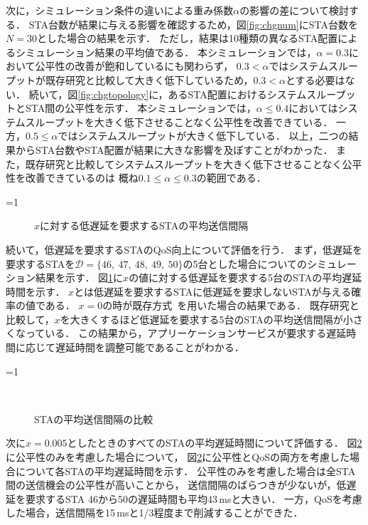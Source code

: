 \documentclass[master]{kuisthesis}		%
\newcounter{flagFig}
\begin{document}
			次に，シミュレーション条件の違いによる重み係数$\alpha$の影響の差について検討する．
			STA台数が結果に与える影響を確認するため，図\ref{fig:chgnum}にSTA台数を$N=30$とした場合の結果を示す．
			ただし，結果は10種類の異なるSTA配置によるシミュレーション結果の平均値である．
			本シミュレーションでは，$\alpha=0.3$において公平性の改善が飽和しているにも関わらず，
			$0.3<\alpha$ではシステムスループットが既存研究と比較して大きく低下しているため，$0.3<\alpha$とする必要はない．
			続いて，図\ref{fig:chgtopology}に，あるSTA配置におけるシステムスループットとSTA間の公平性を示す．
			本シミュレーションでは，$\alpha\leq0.4$においてはシステムスループットを大きく低下させることなく公平性を改善できている．
			一方，$0.5\leq\alpha$ではシステムスループットが大きく低下している．
			以上，二つの結果からSTA台数やSTA配置が結果に大きな影響を及ぼすことがわかった．
			また，既存研究と比較してシステムスループットを大きく低下させることなく公平性を改善できているのは
			概ね$0.1\leq\alpha\leq0.3$の範囲である．

			\par
			\ifnum\value{flagFig}=1 {\begin{figure}[t]
				\centering
				\caption{$x$に対する低遅延を要求するSTAの平均送信間隔}
				\label{fig:chnx}
			\end{figure}}\fi
			続いて，低遅延を要求するSTAのQoS向上について評価を行う．
			まず，低遅延を要求するSTAを${\mathcal D}=\{46,\ 47,\ 48,\ 49,\ 50\}$の5台とした場合についてのシミュレーション結果を示す．
			図\ref{fig:chnx}に$x$の値に対する低遅延を要求する5台のSTAの平均遅延時間を示す．
			$x$とは低遅延を要求するSTAに低遅延を要求しないSTAが与える確率の値である．
			$x=0$の時が既存方式~\cite{promac}を用いた場合の結果である．
			既存研究と比較して，$x$を大きくするほど低遅延を要求する5台のSTAの平均送信間隔が小さくなっている．
			この結果から，アプリーケーションサービスが要求する遅延時間に応じて遅延時間を調整可能であることがわかる．
			\par
			\ifnum\value{flagFig}=1 {\begin{figure}[t]
				\centering
				\\
				\caption{STAの平均送信間隔の比較}
				\label{fig:inter}
			\end{figure}}\fi
			次に$x=0.005$としたときのすべてのSTAの平均遅延時間について評価する．
			図\ref{fig:inter}に公平性のみを考慮した場合について，
			図\ref{fig:inter}に公平性とQoSの両方を考慮した場合について各STAの平均遅延時間を示す．
			公平性のみを考慮した場合は全STA間の送信機会の公平性が高いことから，
			送信間隔のばらつきが少ないが，低遅延を要求するSTA 46から50の遅延時間も平均43\,msと大きい．
			一方，QoSを考慮した場合，送信間隔を15\,msと1/3程度まで削減することができた．
\end{document}
